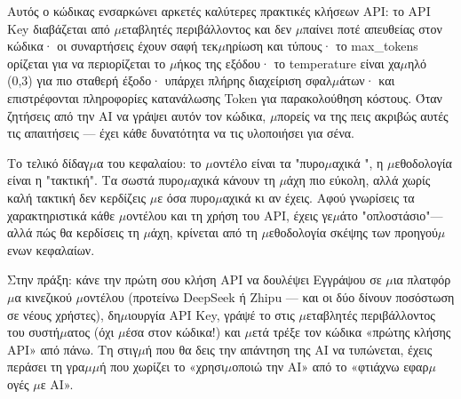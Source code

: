 Αυτός ο κώδικας ενσαρκώνει αρκετές καλύτερες πρακτικές κλήσεων API: το API Key διαβάζεται από $\mu$εταβλητές περιβάλλοντος και δεν $\mu$παίνει ποτέ απευθείας στον κώδικα· οι συναρτήσεις έχουν σαφή τεκ$\mu$ηρίωση και τύπους· το max\_tokens ορίζεται για να περιορίζεται το $\mu$ήκος της εξόδου· το temperature είναι χα$\mu$ηλό (0,3) για πιο σταθερή έξοδο· υπάρχει πλήρης διαχείριση σφαλ$\mu$άτων· και επιστρέφονται πληροφορίες κατανάλωσης Token για παρακολούθηση κόστους. Όταν ζητήσεις από την AI να γράψει αυτόν τον κώδικα, $\mu$πορείς να της πεις ακριβώς αυτές τις απαιτήσεις — έχει κάθε δυνατότητα να τις υλοποιήσει για σένα.

Το τελικό δίδαγ$\mu$α του κεφαλαίου: το $\mu$οντέλο είναι τα "πυρο$\mu$αχικά ", η $\mu$εθοδολογία είναι η "τακτική". Τα σωστά πυρο$\mu$αχικά κάνουν τη $\mu$άχη πιο εύκολη, αλλά χωρίς καλή τακτική δεν κερδίζεις $\mu$ε όσα πυρο$\mu$αχικά κι αν έχεις. Αφού γνωρίσεις τα χαρακτηριστικά κάθε $\mu$οντέλου και τη χρήση του API, έχεις γε$\mu$άτο "οπλοστάσιο"—αλλά πώς θα κερδίσεις τη $\mu$άχη, κρίνεται από τη $\mu$εθοδολογία σκέψης των προηγού$\mu$ενων κεφαλαίων.

\begin{tcbpractice}{Στην πράξη: κάνε την πρώτη σου κλήση API να δουλέψει}
Εγγράψου σε $\mu$ια πλατφόρ$\mu$α κινεζικού $\mu$οντέλου (προτείνω DeepSeek ή Zhipu — και οι δύο δίνουν ποσόστωση σε νέους χρήστες), δη$\mu$ιουργία API Key, γράψέ το στις $\mu$εταβλητές περιβάλλοντος του συστή$\mu$ατος (όχι $\mu$έσα στον κώδικα!) και $\mu$ετά τρέξε τον κώδικα «πρώτης κλήσης API» από πάνω. Τη στιγ$\mu$ή που θα δεις την απάντηση της AI να τυπώνεται, έχεις περάσει τη γρα$\mu$$\mu$ή που χωρίζει το «χρησι$\mu$οποιώ την AI» από το «φτιάχνω εφαρ$\mu$ογές $\mu$ε AI».

\end{tcbpractice}

